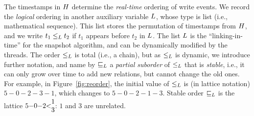 The timestamps in $H$ determine the \emph{real-time} ordering of
write events. We record the \emph{logical} ordering in another
auxiliary variable $L$, whose type is list (i.e., mathematical
sequence). This list stores the permutation of timestamps from
$H$, and we write $t_1 \mathrel{\leq_L} t_2$ if $t_1$ appears before $t_2$ in
$L$. The list $L$ is the ``linking-in-time'' for the
snapshot algorithm, and can be dynamically modified by the threads.
%
%
The order $\mathrel{\leq_L}$ is total (i.e., a chain), but as $\mathrel{\leq_L}$ is dynamic,
we introduce further notation, and name by $\mathrel{\sqsubseteq_L}$ a \emph{partial
  suborder} of $\mathrel{\leq_L}$ that is \emph{stable}, i.e., it can only grow
over time to add new relations, but cannot change the old ones. 
%
For example, in Figure~\ref{fig:reorder}, the initial value of $\mathrel{\leq_L}$ is
(in lattice notation) $5{-}0{-}2{-}3{-}1$, which changes to $5{-}0{-}2{-}1{-}3$. Stable
order $\mathrel{\sqsubseteq_L}$ is the lattice
$5{-}0{-}2{<}\!\!\!\begin{array}[c]{c}1\\ 3\end{array}\!\!\!$: $1$ and $3$ are unrelated.

